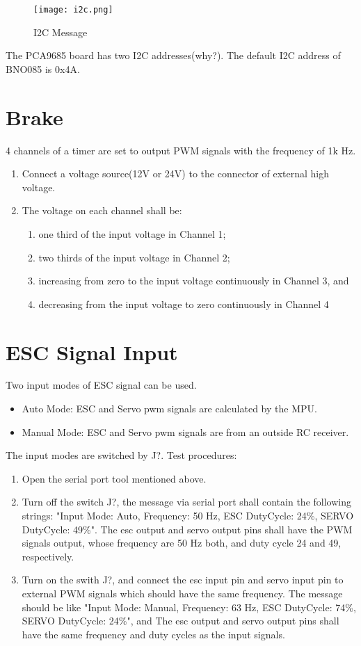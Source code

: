 \documentclass{article}
\begin{document}
\begin{figure}
    \centering
    \texttt{[image: i2c.png]}
    \caption{I2C Message}
    \label{fig:i2c}
\end{figure}

The PCA9685 board has two I2C addresses(why?). The default I2C address of BNO085 is 0x4A.

\section{Brake}
4 channels of a timer are set to output PWM signals with the frequency of 1k Hz.
\begin{enumerate}
    \item Connect a voltage source(12V or 24V) to the connector of external high voltage. 
    \item The voltage on each channel shall be:
    \begin{enumerate}
        \item one third of the input voltage in Channel 1;
        \item two thirds of the input voltage in Channel 2;
        \item increasing from zero to the input voltage continuously in Channel 3, and
        \item decreasing from the input voltage to zero continuously in Channel 4
    \end{enumerate}    
 
\end{enumerate}

\section{ESC Signal Input}
Two input modes of ESC signal can be used.


\begin{itemize}
    \item Auto Mode: ESC and Servo pwm signals are calculated by the MPU.
    \item Manual Mode: ESC and Servo pwm signals are from an outside RC receiver.
\end{itemize} 
The input modes are switched by J?.
Test procedures:
\begin{enumerate}
    \item Open the serial port tool mentioned above. 
    \item Turn off the switch J?, the message via serial port shall contain the following strings: "Input Mode: Auto, Frequency: 50 Hz, ESC DutyCycle: 24\%, SERVO DutyCycle: 49\%". The esc output and servo output pins shall have the PWM signals output, whose frequency are 50 Hz both, and duty cycle 24 and 49, respectively.
    \item Turn on the swith J?, and connect the esc input pin and servo input pin to external PWM signals which should have the same frequency. The message should be like "Input Mode: Manual, Frequency: 63 Hz, ESC DutyCycle: 74\%, SERVO DutyCycle: 24\%", and The esc output and servo output pins shall have the same frequency and duty cycles as the input signals.
\end{enumerate}
\end{document}
